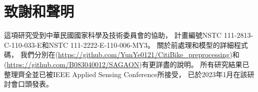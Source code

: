 \documentclass[a4paper,12pt]{extarticle}
\begin{document}
    \newpage
    \section{致謝和聲明}
        
        這項研究受到中華民國國家科學及技術委員會的協助，
        計畫編號NSTC 111-2813-C-110-033-E和NSTC 111-2222-E-110-006-MY3。
        關於前處理和模型的詳細程式碼，
        我們分別在(\url{https://github.com/YunYe0121/CitiBike_preprocessing})和(\url{https://github.com/B083040012/SAGAON})有更詳盡的說明。
        所有研究結果已整理齊全並已被IEEE Applied Sensing Conference\cite{SAGAON}所接受，
        已於2023年1月在該研討會口頭發表。

        \renewcommand\refname{\arabic{section}\hspace{1em}參考文獻}
        
        
\end{document}
